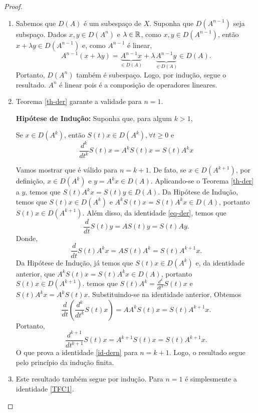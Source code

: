 \begin{proof}\noindent

\begin{enumerate}[$(i)$]
\item Sabemos que $D(A)$ é um subespaço de $X$. Suponha que $D(A^{n-1})$ seja subspaço. Dados $x,y\in D(A^n)$ e $\lambda\in \mathbb{R}$, como $x,y\in D(A^{n-1})$, então
$x+\lambda y\in D(A^{n-1})$ e, como $A^{n-1}$ é linear,
\[A^{n-1}(x+\lambda y)=\underbrace{A^{n-1}x}_{\in D(A)}+\lambda \underbrace{A^{n-1}y}_{\in D(A)}\in D(A).\]
Portanto, $D(A^n)$ também é subespaço. Logo, por indução, segue o resultado. $A^n$ é linear pois é a composição de operadores lineares.

\item Teorema \ref{th-der} garante a validade para $n=1$. 

\begin{tcolorbox}
\noindent\textbf{Hipótese de Indução:} Suponha que, para algum $k>1$,

\noindent Se $x \in {D}\left(A^k\right)$, então $S(t) x \in {D}\left(A^k\right), \forall t \geq 0$ e
\[
\frac{d^k}{d t^k} S(t) x=A^k S(t) x=S(t) A^k x
\]
\end{tcolorbox}

Vamos mostrar que é válido para $n=k+1$. De fato, se \underline{$x\in D(A^{k+1})$}, por definição, $x\in D(A^k)$ e $y=A^kx\in D(A)$. Aplicando-se o  Teorema \ref{th-der} a $y$, temos que $S(t)A^kx=S(t)y\in D(A)$.  Da Hipótese de Indução, temos que $S(t)x\in D(A^k)$ e $A^kS(t)x=S(t)A^kx\in D(A)$, portanto \underline{$S(t)x\in D(A^{k+1})$}. Além disso, da identidade \eqref{eq-der}, temos que
\[
\frac{d}{dt} S(t)y=AS(t)y=S(t)Ay.
\]
Donde,
\[
\frac{d}{dt}S(t)A^kx=AS(t)A^k=S(t)A^{k+1}x.
\]
Da Hipótese de Indução, já temos que $S(t)x\in D(A^k)$ e, da identidade anterior, que $A^kS(t)x=S(t)A^kx\in D(A)$, portanto $S(t)x\in D(A^{k+1})$. temos que $S(t)A^k=\frac{d^k}{dt^k}S(t)x$ e $S(t)A^kx=A^kS(t)x$. Substituindo-se na identidade anterior, Obtemos
\[
\frac{d}{dt}\left(\frac{d^k}{dt^k}S(t)x\right)=AA^kS(t)x=S(t)A^{k+1}x.
\]
Portanto, 
\[
\frac{d^{k+1}}{dt^{k+1}}S(t)x=A^{k+1}S(t)x=S(t)A^{k+1}x.
\]
O que prova a identidade \eqref{id-dern} para $n={k+1}$. Logo, o resultado segue pelo princípio da indução finita.

\item Este resultado também segue por indução. Para $n=1$ é simplesmente a identidade \eqref{TFC1}. 


\end{enumerate}
\end{proof}
